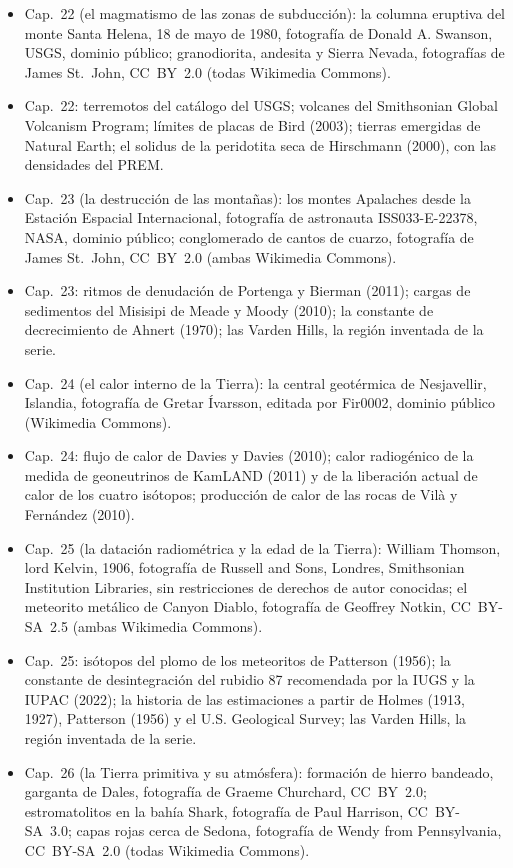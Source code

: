 \begin{itemize}
  \item Cap.~22 (el magmatismo de las zonas de subducción): la columna eruptiva del monte Santa Helena, 18 de mayo de 1980, fotografía de Donald A. Swanson, USGS, dominio público; granodiorita, andesita y Sierra Nevada, fotografías de James St.~John, CC~BY~2.0 (todas Wikimedia Commons).
  \item Cap.~22: terremotos del catálogo del USGS; volcanes del Smithsonian Global Volcanism Program; límites de placas de Bird (2003); tierras emergidas de Natural Earth; el solidus de la peridotita seca de Hirschmann (2000), con las densidades del PREM.
  \item Cap.~23 (la destrucción de las montañas): los montes Apalaches desde la Estación Espacial Internacional, fotografía de astronauta ISS033-E-22378, NASA, dominio público; conglomerado de cantos de cuarzo, fotografía de James St.~John, CC~BY~2.0 (ambas Wikimedia Commons).
  \item Cap.~23: ritmos de denudación de Portenga y Bierman (2011); cargas de sedimentos del Misisipi de Meade y Moody (2010); la constante de decrecimiento de Ahnert (1970); las Varden Hills, la región inventada de la serie.
  \item Cap.~24 (el calor interno de la Tierra): la central geotérmica de Nesjavellir, Islandia, fotografía de Gretar Ívarsson, editada por Fir0002, dominio público (Wikimedia Commons).
  \item Cap.~24: flujo de calor de Davies y Davies (2010); calor radiogénico de la medida de geoneutrinos de KamLAND (2011) y de la liberación actual de calor de los cuatro isótopos; producción de calor de las rocas de Vilà y Fernández (2010).
  \item Cap.~25 (la datación radiométrica y la edad de la Tierra): William Thomson, lord Kelvin, 1906, fotografía de Russell and Sons, Londres, Smithsonian Institution Libraries, sin restricciones de derechos de autor conocidas; el meteorito metálico de Canyon Diablo, fotografía de Geoffrey Notkin, CC~BY-SA~2.5 (ambas Wikimedia Commons).
  \item Cap.~25: isótopos del plomo de los meteoritos de Patterson (1956); la constante de desintegración del rubidio 87 recomendada por la IUGS y la IUPAC (2022); la historia de las estimaciones a partir de Holmes (1913, 1927), Patterson (1956) y el U.S. Geological Survey; las Varden Hills, la región inventada de la serie.
  \item Cap.~26 (la Tierra primitiva y su atmósfera): formación de hierro bandeado, garganta de Dales, fotografía de Graeme Churchard, CC~BY~2.0; estromatolitos en la bahía Shark, fotografía de Paul Harrison, CC~BY-SA~3.0; capas rojas cerca de Sedona, fotografía de Wendy from Pennsylvania, CC~BY-SA~2.0 (todas Wikimedia Commons).

\end{itemize}
